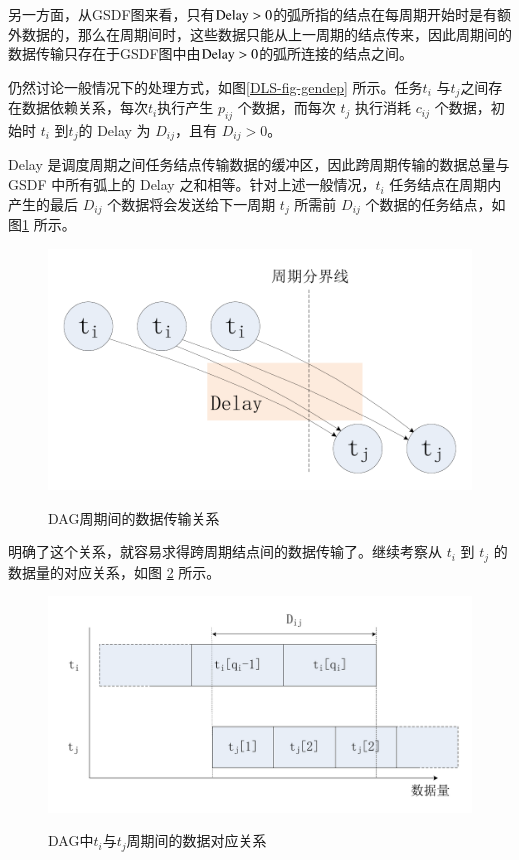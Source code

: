 另一方面，从GSDF图来看，只有$\textnormal{Delay}>0$的弧所指的结点在每周期开始时是有额外数据的，那么在周期间时，这些数据只能从上一周期的结点传来，因此周期间的数据传输只存在于GSDF图中由$\textnormal{Delay}>0$的弧所连接的结点之间。

仍然讨论一般情况下的处理方式，如图\ref{DLS-fig-gendep} 所示。任务$t_i$ 与$t_j$之间存在数据依赖关系，每次$t_i$执行产生 $p_{ij}$ 个数据，而每次 $t_j$ 执行消耗 $c_{ij}$ 个数据，初始时 $t_i$ 到$t_j$的 Delay 为 $D_{ij}$，且有 $D_{ij}>0$。

Delay 是调度周期之间任务结点传输数据的缓冲区，因此跨周期传输的数据总量与GSDF 中所有弧上的 Delay 之和相等。针对上述一般情况，$t_i$ 任务结点在周期内产生的最后 $D_{ij}$ 个数据将会发送给下一周期 $t_j$ 所需前 $D_{ij}$ 个数据的任务结点，如图\ref{DLS-fig-interp} 所示。
\begin{figure}[!hbt]
  \centering
  \includegraphics[height=20ex]{figure/DLS-interp.pdf}\\
  \caption{DAG周期间的数据传输关系}\label{DLS-fig-interp}
\end{figure}

明确了这个关系，就容易求得跨周期结点间的数据传输了。继续考察从 $t_i$ 到 $t_j$ 的数据量的对应关系，如图 \ref{DAG-fig-interp-data} 所示。

\begin{figure}[!hbt]
  \centering
  \includegraphics[height=25ex]{figure/DAG-interp-data.pdf}\\
  \caption{DAG中$t_i$与$t_j$周期间的数据对应关系}\label{DAG-fig-interp-data}
\end{figure}

